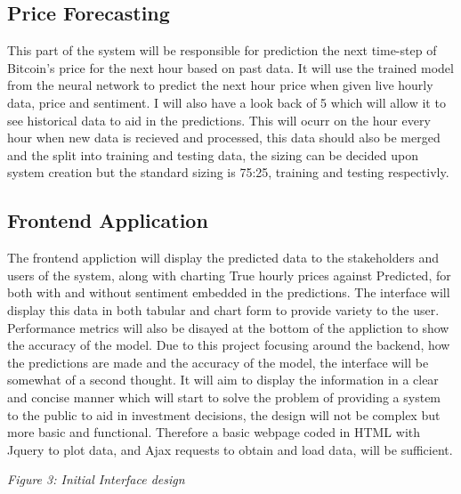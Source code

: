 \documentclass[oneside, 10pt]{article}
\begin{document}
		\subsection{Price Forecasting}
		This part of the system will be responsible for prediction the next time-step of Bitcoin's price for the next hour based on past data. It will use the trained model from the neural network to predict the next hour price when given live hourly data, price and sentiment. I will also have a look back of 5 which will allow it to see historical data to aid in the predictions. This will ocurr on the hour every hour when new data is recieved and processed, this data should also be merged and the split into training and testing data, the sizing can be decided upon system creation but the standard sizing is 75:25, training and testing respectivly.
		
		\subsection{Frontend Application}
		The frontend appliction will display the predicted data to the stakeholders and users of the system, along with charting True hourly prices against Predicted, for both with and without sentiment embedded in the predictions. The interface will display this data in both tabular and chart form to provide variety to the user. Performance metrics will also be disayed at the bottom of the appliction to show the accuracy of the model. Due to this project focusing around the backend, how the predictions are made and the accuracy of the model, the interface will be somewhat of a second thought. It will aim to display the information in a clear and concise manner which will start to solve the problem of providing a system to the public to aid in investment decisions, the design will not be complex but more basic and functional. Therefore a basic webpage coded in HTML with Jquery to plot data, and Ajax requests to obtain and load data, will be sufficient.
		
		\begin{center}
			\textit{Figure 3: Initial Interface design}
		\end{center}
	
\end{document}
